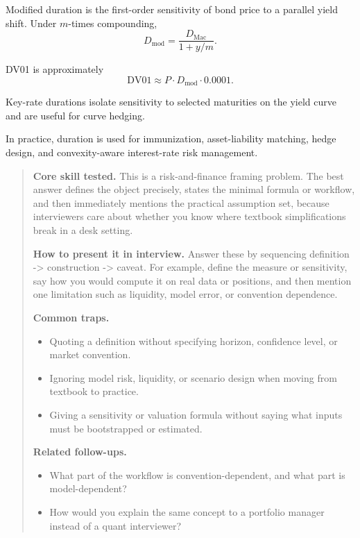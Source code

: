 \documentclass[11pt,letterpaper,openany]{book}
\newenvironment{EditorialNote}
  {\begin{quote}\small\setlength{\parskip}{0.25em}}
  {\end{quote}}
\newcommand{\QuestionSpacer}{\vspace{0.4em}}
\begin{document}
Modified duration is the first-order sensitivity of bond price to a parallel yield shift. Under \(m\)-times compounding,
\[
D_{\mathrm{mod}}=\frac{D_{\mathrm{Mac}}}{1+y/m}.
\]

DV01 is approximately
\[
\mathrm{DV01}\approx P \cdot D_{\mathrm{mod}} \cdot 0.0001.
\]

Key-rate durations isolate sensitivity to selected maturities on the yield curve and are useful for curve hedging.

In practice, duration is used for immunization, asset-liability matching, hedge design, and convexity-aware interest-rate risk management.

\begin{EditorialNote}


\textbf{Core skill tested.} This is a risk-and-finance framing problem. The best answer defines the object precisely, states the minimal formula or workflow, and then immediately mentions the practical assumption set, because interviewers care about whether you know where textbook simplifications break in a desk setting.

\textbf{How to present it in interview.} Answer these by sequencing definition -> construction -> caveat. For example, define the measure or sensitivity, say how you would compute it on real data or positions, and then mention one limitation such as liquidity, model error, or convention dependence.

\textbf{Common traps.}
\begin{itemize}
\item Quoting a definition without specifying horizon, confidence level, or market convention.
\item Ignoring model risk, liquidity, or scenario design when moving from textbook to practice.
\item Giving a sensitivity or valuation formula without saying what inputs must be bootstrapped or estimated.
\end{itemize}

\textbf{Related follow-ups.}
\begin{itemize}
\item What part of the workflow is convention-dependent, and what part is model-dependent?
\item How would you explain the same concept to a portfolio manager instead of a quant interviewer?
\end{itemize}


\end{EditorialNote}
\QuestionSpacer
\end{document}
